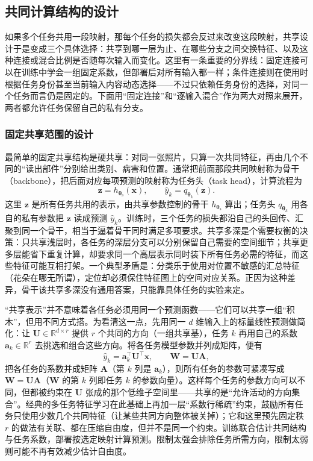 \subsection{共同计算结构的设计}
\label{sec:ket-sharing-computation}

如果多个任务共用一段映射，那每个任务的损失都会反过来改变这段映射，共享设计于是变成三个具体选择：共享到哪一层为止、在哪些分支之间交换特征、以及这种连接或混合比例是否随每次输入而变化。这里有一条重要的分界线：固定连接可以在训练中学会一组固定系数，但部署后对所有输入都一样；条件连接则在使用时根据任务身份甚至当前输入内容动态选择——不过只依赖任务身份的选择，对同一个任务而言仍是固定的。下面用“固定连接”和“逐输入混合”作为两大对照来展开，两者都允许任务保留自己的私有分支。

\subsubsection{固定共享范围的设计}
\label{sec:ket-sharing-fixed}

最简单的固定共享结构是硬共享：对同一张照片，只算一次共同特征，再由几个不同的“读出部件”分别给出类别、病害和位置。通常把前面那段共同映射称为骨干（backbone），把后面对应每项预测的映射称为任务头（task head），计算流程为
\begin{equation}
  \bm z=h_{\bm{\theta}_{\mathrm{s}}}(\bm x),
  \qquad
  \hat y_k=q_{\bm{\theta}_k}(\bm z).
  \label{eq:ket-sharing-backbone}
\end{equation}
这里 $\bm z$ 是所有任务共用的表示，由共享参数控制的骨干 $h_{\bm{\theta}_{\mathrm{s}}}$ 算出；任务头 $q_{\bm{\theta}_k}$ 用各自的私有参数把 $\bm z$ 读成预测 $\hat y_k$。训练时，三个任务的损失都沿自己的头回传、汇聚到同一个骨干，相当于逼着骨干同时满足多项要求。共享多深是个需要权衡的决策：只共享浅层时，各任务的深层分支可以分别保留自己需要的空间细节；共享更多层能省下重复计算，却要求同一个高层表示同时装下所有任务必需的特征，而这些特征可能互相打架。一个典型矛盾是：分类乐于使用对位置不敏感的汇总特征（花朵在哪无所谓），定位却必须保住特征图上的空间对应关系。正因为这种差异，骨干该共享多深没有通用答案，只能靠具体任务的实验来定。

“共享表示”并不意味着各任务必须用同一个预测函数——它们可以共享一组“积木”，但用不同方式搭。为看清这一点，先用同一 $d$ 维输入上的标量线性预测做简化：让 $\bm U\in\mathbb R^{d\times r}$ 提供 $r$ 个共同的方向（一组共享基），任务 $k$ 再用自己的系数 $\bm a_k\in\mathbb R^r$ 去挑选和组合这些方向。将各任务模型参数并列成矩阵，便有
\begin{equation}
  \hat y_k=\bm a_k^{\top}\bm U^{\top}\bm x,
  \qquad
  \bm W=\bm U\bm A,
  \label{eq:ket-sharing-subspace}
\end{equation}
把各任务的系数并成矩阵 $\bm A$（第 $k$ 列是 $\bm a_k$），则所有任务的参数可紧凑写成 $\bm W=\bm U\bm A$（$\bm W$ 的第 $k$ 列即任务 $k$ 的参数向量）。这样每个任务的参数方向可以不同，但都被约束在 $\bm U$ 张成的那个低维子空间里——共享的是“允许活动的方向集合”。经典的多任务特征学习在此基础上再加一层“系数行稀疏”约束，鼓励所有任务只使用少数几个共同特征（让某些共同方向整体被关掉）；它和这里预先固定秩 $r$ 的做法有关联、都在压缩自由度，但并不是同一个约束。训练联合估计共同结构与任务系数，部署按选定映射计算预测。限制太强会排除任务所需方向，限制太弱则可能不再有效减少估计自由度。

